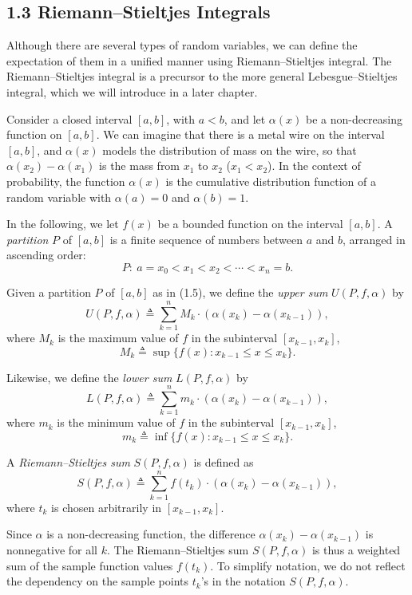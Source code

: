 \subsection*{1.3 Riemann--Stieltjes Integrals}

Although there are several types of random variables, we can define the expectation of them in a unified manner using Riemann--Stieltjes integral. The Riemann--Stieltjes integral is a precursor to the more general Lebesgue--Stieltjes integral, which we will introduce in a later chapter.

Consider a closed interval $[a,b]$, with $a<b$, and let $\alpha(x)$ be a non-decreasing function on $[a,b]$. We can imagine that there is a metal wire on the interval $[a,b]$, and $\alpha(x)$ models the distribution of mass on the wire, so that $\alpha(x_2)-\alpha(x_1)$ is the mass from $x_1$ to $x_2$ ($x_1<x_2$). In the context of probability, the function $\alpha(x)$ is the cumulative distribution function of a random variable with $\alpha(a)=0$ and $\alpha(b)=1$.

In the following, we let $f(x)$ be a bounded function on the interval $[a,b]$. A \textit{partition} $P$ of $[a,b]$ is a finite sequence of numbers between $a$ and $b$, arranged in ascending order:
\begin{equation}
P:\ a=x_0<x_1<x_2<\cdots <x_n=b.
\tag{1.5}
\end{equation}

Given a partition $P$ of $[a,b]$ as in (1.5), we define the \textit{upper sum} $U(P,f,\alpha)$ by
\[
U(P,f,\alpha)\triangleq \sum_{k=1}^{n} M_k\cdot (\alpha(x_k)-\alpha(x_{k-1})),
\]
where $M_k$ is the maximum value of $f$ in the subinterval $[x_{k-1},x_k]$,
\[
M_k\triangleq \sup\{f(x): x_{k-1}\le x\le x_k\}.
\]

Likewise, we define the \textit{lower sum} $L(P,f,\alpha)$ by
\[
L(P,f,\alpha)\triangleq \sum_{k=1}^{n} m_k\cdot (\alpha(x_k)-\alpha(x_{k-1})),
\]
where $m_k$ is the minimum value of $f$ in the subinterval $[x_{k-1},x_k]$,
\[
m_k\triangleq \inf\{f(x): x_{k-1}\le x\le x_k\}.
\]

A \textit{Riemann--Stieltjes sum} $S(P,f,\alpha)$ is defined as
\[
S(P,f,\alpha)\triangleq \sum_{k=1}^{n} f(t_k)\cdot (\alpha(x_k)-\alpha(x_{k-1})),
\]
where $t_k$ is chosen arbitrarily in $[x_{k-1},x_k]$.

Since $\alpha$ is a non-decreasing function, the difference $\alpha(x_k)-\alpha(x_{k-1})$ is nonnegative for all $k$. The Riemann--Stieltjes sum $S(P,f,\alpha)$ is thus a weighted sum of the sample function values $f(t_k)$. To simplify notation, we do not reflect the dependency on the sample points $t_k$'s in the notation $S(P,f,\alpha)$.

